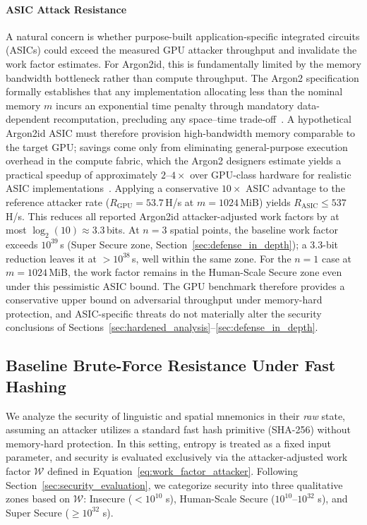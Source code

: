 \documentclass[mathematics,article,accept,pdftex,moreauthors]{Definitions/mdpi}
\begin{document}
\paragraph*{ASIC Attack Resistance}
{A natural concern is whether purpose-built application-specific integrated circuits (ASICs) could exceed the measured GPU attacker throughput and invalidate the work factor estimates. For Argon2id, this is fundamentally limited by the memory bandwidth bottleneck rather than compute throughput. The Argon2 specification formally establishes that any implementation allocating less than the nominal memory $m$ incurs an exponential time penalty through mandatory data-dependent recomputation, precluding any space--time trade-off~\cite{7467361}. A hypothetical Argon2id ASIC must therefore provision high-bandwidth memory comparable to the target GPU; savings come only from eliminating general-purpose execution overhead in the compute fabric, which the Argon2 designers estimate yields a practical speedup of approximately $2$--$4\times$ over GPU-class hardware for realistic ASIC implementations~\cite{7467361,Wetzels2016}. Applying a conservative $10\times$ ASIC advantage to the reference attacker rate ($R_{\text{GPU}} = 53.7$\,H/s at $m=1024$\,MiB) yields $R_{\text{ASIC}} \leq 537$\,H/s. This reduces all reported Argon2id attacker-adjusted work factors by at most $\log_2(10) \approx 3.3$\,bits. At $n=3$ spatial points, the baseline work factor exceeds $10^{39}$\,s (Super Secure zone, Section~\ref{sec:defense_in_depth});
a 3.3-bit reduction leaves it at $>$$10^{38}$\,s, well within the same zone. For the $n=1$ case at $m=1024$\,MiB, the work factor remains in the Human-Scale Secure zone even under this pessimistic ASIC bound. The GPU benchmark therefore provides a conservative upper bound on adversarial throughput under memory-hard protection, and ASIC-specific threats do not materially alter the security conclusions of Sections~\ref{sec:hardened_analysis}--\ref{sec:defense_in_depth}.}

\subsection{Baseline Brute-Force Resistance Under Fast Hashing}
\label{sec:unhardened_analysis}

We analyze the security of linguistic and spatial mnemonics in their \emph{raw} state, assuming an attacker utilizes a standard fast hash primitive (SHA-256) without memory-hard protection. In this setting, entropy is treated as a fixed input parameter, and security is evaluated exclusively via the attacker-adjusted work factor $\mathcal{W}$ defined in Equation~\eqref{eq:work_factor_attacker}. Following Section~\ref{sec:security_evaluation}, we categorize security into three qualitative zones based on $\mathcal{W}$: Insecure ($<$$10^{10}$ s), Human-Scale Secure ($10^{10}$--$10^{32}$ s), and Super Secure ($\ge$$10^{32}$ s).
\end{document}
